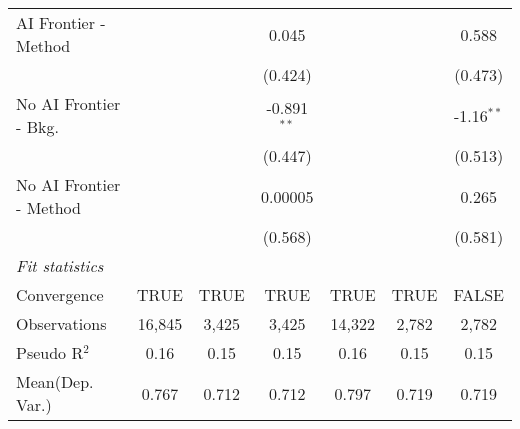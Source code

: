 \begin{tabular}{lcccccc}
   AI Frontier - Method    &               &              & 0.045         &               &              & 0.588\\   
                           &               &              & (0.424)       &               &              & (0.473)\\   
   No AI Frontier - Bkg.   &               &              & -0.891$^{**}$ &               &              & -1.16$^{**}$\\   
                           &               &              & (0.447)       &               &              & (0.513)\\   
   No AI Frontier - Method &               &              & 0.00005       &               &              & 0.265\\   
                           &               &              & (0.568)       &               &              & (0.581)\\   
   \midrule
   \emph{Fit statistics}\\
   Convergence             &TRUE           & TRUE         & TRUE          & TRUE          & TRUE         & FALSE\\  
   Observations            & 16,845        & 3,425        & 3,425         & 14,322        & 2,782        & 2,782\\  
   Pseudo R$^2$            & 0.16          & 0.15         & 0.15          & 0.16          & 0.15         & 0.15\\  
Mean(Dep. Var.) & 0.767 & 0.712 & 0.712 & 0.797 & 0.719 & 0.719 \\
   

\end{tabular}
